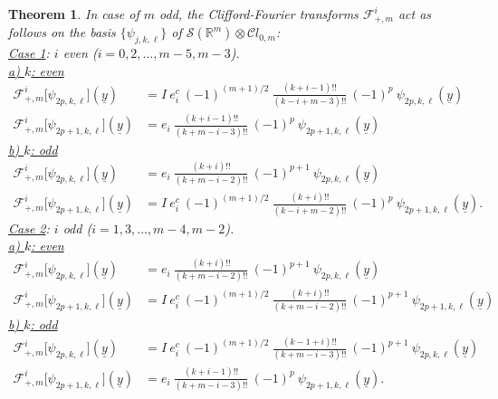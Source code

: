 \documentclass{amsart}
\newtheorem{theorem}{Theorem}[section]
\theoremstyle{remark}
\begin{document}
\begin{theorem}
\label{EigValsOdd}
In case of $m$ odd, the Clifford-Fourier transforms $\mathcal{F}^{i}_{+,m}$ act as follows on the basis $\lbrace \psi_{j,k,\ell} \rbrace$ of $\mathcal{S}(\mathbb{R}^m) \otimes {\mathcal{C}} l_{0,m}$:\vspace{0,2cm}\\
\emph{\underline{Case 1}: $i$ even} ($i=0,2,\ldots,m-5,m-3$).\vspace{0,1cm}\\
\underline{a) $k$: even}
\begin{align*}
\mathcal{F}^{i}_{+,m} \lbrack \psi_{2p,k,\ell} \rbrack ({\underline{y}}) &=  I \ e_i^c \ (-1)^{(m+1)/2} \ \frac{(k+i-1)!!}{(k-i+m-3)!!} \ (-1)^p \ \psi_{2p,k,\ell}({\underline{y}})\\
\mathcal{F}^{i}_{+,m} \lbrack \psi_{2p+1,k,\ell} \rbrack ({\underline{y}}) &=  e_i \  \frac{(k+i-1)!!}{(k+m-i-3)!!} \ (-1)^p \ \psi_{2p+1,k,\ell}({\underline{y}})
\end{align*}
\underline{b) $k$: odd}
\begin{align*}
\mathcal{F}^{i}_{+,m} \lbrack \psi_{2p,k,\ell} \rbrack ({\underline{y}}) &=    e_i \ \frac{(k+i)!!}{(k+m-i-2)!!} \ (-1)^{p+1} \ \psi_{2p,k,\ell}({\underline{y}})\\
\mathcal{F}^{i}_{+,m} \lbrack \psi_{2p+1,k,\ell} \rbrack ({\underline{y}}) &=  I \ e_i^c \ (-1)^{(m+1)/2} \  \frac{(k+i)!!}{(k-i+m-2)!!} \ (-1)^p \ \psi_{2p+1,k,\ell}({\underline{y}}).
\end{align*}
\emph{\underline{Case 2}: $i$ odd} ($i=1,3,\ldots,m-4,m-2$).\vspace{0,1cm}\\
\underline{a) $k$: even}
\begin{align*}
\mathcal{F}^{i}_{+,m} \lbrack \psi_{2p,k,\ell} \rbrack ({\underline{y}}) &=   e_i \ \frac{(k+i)!!}{(k+m-i-2)!!} \ (-1)^{p+1} \ \psi_{2p,k,\ell}({\underline{y}})\\
\mathcal{F}^{i}_{+,m} \lbrack \psi_{2p+1,k,\ell} \rbrack ({\underline{y}}) &=  I \ e_i^c \ (-1)^{(m+1)/2} \  \frac{(k+i)!!}{(k+m-i-2)!!} \ (-1)^{p+1} \ \psi_{2p+1,k,\ell}({\underline{y}})
\end{align*}
\underline{b) $k$: odd}
\begin{align*}
\mathcal{F}^{i}_{+,m} \lbrack \psi_{2p,k,\ell} \rbrack ({\underline{y}}) &=   I \ e_i^c \ (-1)^{(m+1)/2} \ \frac{(k-1+i)!!}{(k+m-i-3)!!} \ (-1)^{p+1} \ \psi_{2p,k,\ell}({\underline{y}})\\
\mathcal{F}^{i}_{+,m} \lbrack \psi_{2p+1,k,\ell} \rbrack ({\underline{y}}) &=   e_i \ \frac{(k+i-1)!!}{(k+m-i-3)!!} \ (-1)^p \ \psi_{2p+1,k,\ell}({\underline{y}}).
\end{align*}
\end{theorem}
\end{document}
